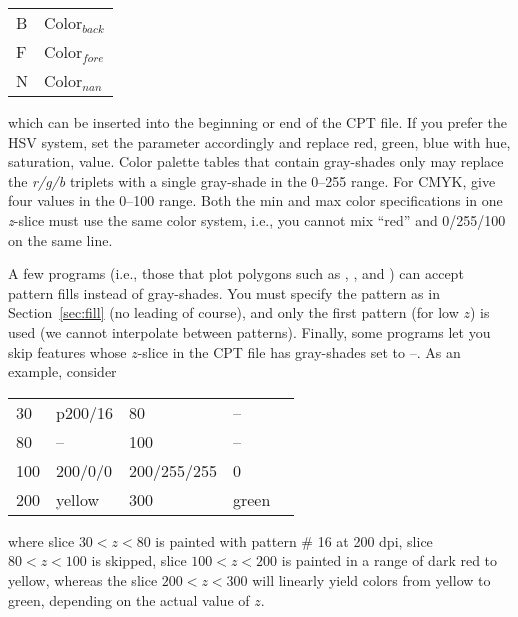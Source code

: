 \begin{center}
\begin{tabular}{ll}
B &  Color$_{back}$ \\ 
F &  Color$_{fore}$ \\ 
N &  Color$_{nan}$ \\
\end{tabular}
\end{center}

\noindent
which can be inserted into the beginning or end of the CPT file.  If
you prefer the HSV system, set the
 parameter accordingly and replace red, green,
blue with hue, saturation, value.  Color palette tables that contain
gray-shades only may replace the \emph{r/g/b} triplets with a single gray-shade
in the 0--255 range.  For CMYK, give four values in the 0--100 range.
Both the min and max color specifications in one \emph{z}-slice must use
the same color system, i.e., you cannot mix ``red'' and 0/255/100 on the
same line.

A few programs (i.e., those that plot polygons such as ,
,  and ) can accept pattern fills instead
of gray-shades.  You must specify the pattern as in Section~\ref{sec:fill} (no
leading  of course), and only the first pattern (for low $z$) is used (we cannot
interpolate between patterns).  
Finally, some programs let you skip features whose $z$-slice in the CPT file has
gray-shades set to --.  As an example, consider

\begin{center}
\begin{tabular}{lllll}
30 &  p200/16 &  80 & -- \\ 
80 &  -- &  100 &  -- \\
100 &  200/0/0  &  200/255/255  &  0 \\
200 &  yellow &  300 & green  \\ 
\end{tabular} 
\end{center}
\noindent
where slice $30 < z < 80$ is painted with pattern \# 16 at 200 dpi,
slice $80 < z < 100$ is skipped, slice $100 < z < 200$ is
painted in a range of dark red to yellow, whereas the slice $200 < z < 300$
will linearly yield colors from yellow to green, depending on the actual value
of $z$.



